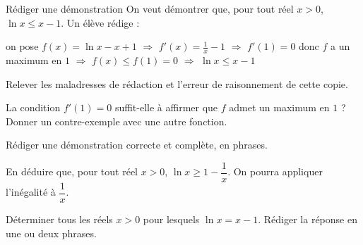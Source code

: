 \begin{exercice}[3]{Rédiger une démonstration}
On veut démontrer que, pour tout réel $x>0$, $\ln x\leq x-1$. Un élève rédige :\par\vspace{1mm}
\begin{tcolorbox}[enhanced,colback=white,colframe=otRule,boxrule=0.5pt,arc=1.5mm,left=3mm,right=3mm,top=1.5mm,bottom=1.5mm,
  fontupper=\itshape\fontsize{10}{13.5}\selectfont]
on pose $f(x)=\ln x-x+1$ $\Rightarrow$ $f'(x)=\frac1x-1$ $\Rightarrow$ $f'(1)=0$ donc $f$ a un maximum en $1$
$\Rightarrow$ $f(x)\leq f(1)=0$ $\Rightarrow$ $\ln x\leq x-1$
\end{tcolorbox}
\begin{questions}
  \item Relever les maladresses de rédaction et l'erreur de raisonnement de cette copie.
  \item La condition $f'(1)=0$ suffit-elle à affirmer que $f$ admet un maximum en $1$ ? Donner un contre-exemple avec une autre
    fonction.
  \item Rédiger une démonstration correcte et complète, en phrases.
\end{questions}
\begin{questions}[resume]
  \item En déduire que, pour tout réel $x>0$, $\ln x\geq1-\dfrac1x$. On pourra appliquer l'inégalité à $\dfrac1x$.
  \item Déterminer tous les réels $x>0$ pour lesquels $\ln x=x-1$. Rédiger la réponse en une ou deux phrases.
\end{questions}
\end{exercice}
